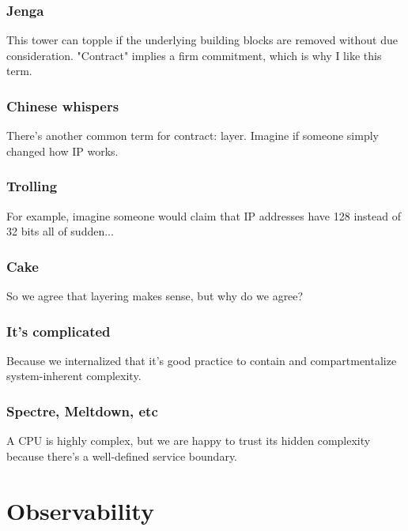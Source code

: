 \documentclass[aspectratio=169]{beamer}
\begin{document}
\begin{frame}
	\frametitle{Jenga}
	\begin{center}
		\vfill
		This tower can topple if the underlying building blocks are removed without due consideration.
		\vfill
		"Contract" implies a firm commitment, which is why I like this term.
		\vfill
	\end{center}
\end{frame}

\begin{frame}
	\frametitle{Chinese whispers}
	\begin{center}
		\vfill
		There's another common term for contract: layer.
		\vfill
		Imagine if someone simply changed how IP works.
		\vfill
	\end{center}
\end{frame}

\begin{frame}
	\frametitle{Trolling}
	\begin{center}
		\vfill
		For example, imagine someone would claim that IP addresses have 128 instead of 32 bits all of sudden...
		\vfill
	\end{center}
\end{frame}

\begin{frame}
	\frametitle{Cake}
	\begin{center}
		\vfill
		So we agree that layering makes sense, but why do we agree?
		\vfill
	\end{center}
\end{frame}

\begin{frame}
	\frametitle{It's complicated}
	\begin{center}
		\vfill
		Because we internalized that it's good practice to contain and compartmentalize system-inherent complexity.
		\vfill
	\end{center}
\end{frame}

\begin{frame}
	\frametitle{Spectre, Meltdown, etc}
	\begin{center}
		\vfill
		A CPU is highly complex, but we are happy to trust its hidden complexity because there's a well-defined service boundary.
		\vfill
	\end{center}
\end{frame}



\section{Observability}
\end{document}
